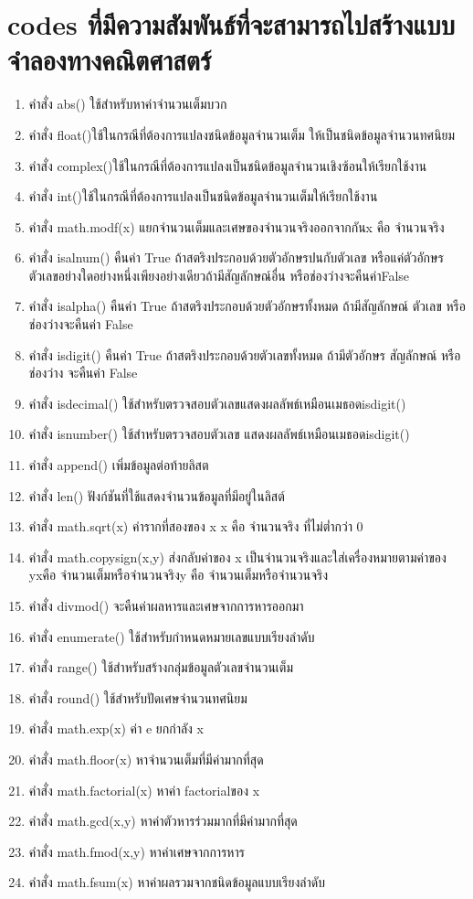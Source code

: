 \documentclass{report}
\begin{document}
\chapter{codes ที่มีความสัมพันธ์ที่จะสามารถไปสร้างแบบจำลองทางคณิตศาสตร์}
\begin{enumerate}
	\item{คำสั่ง abs() ใช้สำหรับหาค่าจำนวนเต็มบวก}
	\item{คำสั่ง float()ใช้ในกรณีที่ต้องการแปลงชนิดข้อมูลจำนวนเต็ม ให้เป็นชนิดข้อมูลจำนวนทศนิยม}
	\item{คำสั่ง complex()ใช้ในกรณีที่ต้องการแปลงเป็นชนิดข้อมูลจำนวนเชิงซ้อนให้เรียกใช้งาน}
	\item{คำสั่ง int()ใช้ในกรณีที่ต้องการแปลงเป็นชนิดข้อมูลจำนวนเต็มให้เรียกใช้งาน}
	\item{คำสั่ง math.modf(x) แยกจำนวนเต็มและเศษของจำนวนจริงออกจากกันx คือ จำนวนจริง}
	\item{คำสั่ง isalnum() คืนค่า True ถ้าสตริงประกอบด้วยตัวอักษรปนกับตัวเลข หรือแค่ตัวอักษรตัวเลขอย่างใดอย่างหนึ่งเพียงอย่างเดียวถ้ามีสัญลักษณ์อื่น หรือช่องว่างจะคืนค่าFalse}
	\item{คำสั่ง isalpha() คืนค่า True ถ้าสตริงประกอบด้วยตัวอักษรทั้งหมด ถ้ามีสัญลักษณ์ ตัวเลข หรือช่องว่างจะคืนค่า False}
	\item{คำสั่ง isdigit() คืนค่า True ถ้าสตริงประกอบด้วยตัวเลขทั้งหมด ถ้ามีตัวอักษร สัญลักษณ์ หรือช่องว่าง จะคืนค่า False}
	\item{คำสั่ง isdecimal() ใช้สำหรับตรวจสอบตัวเลขแสดงผลลัพธ์เหมือนเมธอดisdigit()}
	\item{คำสั่ง isnumber() ใช้สำหรับตรวจสอบตัวเลข แสดงผลลัพธ์เหมือนเมธอดisdigit()}
	\item{คำสั่ง append() เพิ่มข้อมูลต่อท้ายลิสต}
	\item{คำสั่ง len() ฟังก์ชันที่ใช้แสดงจำนวนข้อมูลที่มีอยู่ในลิสต์}
	\item{คำสั่ง math.sqrt(x) ค่ารากที่สองของ x x คือ จำนวนจริง ที่ไม่ต่ำกว่า 0}
	\item{คำสั่ง math.copysign(x,y) ส่งกลับค่าของ x เป็นจำนวนจริงและใส่เครื่องหมายตามค่าของ yxคือ จำนวนเต็มหรือจำนวนจริงy คือ จำนวนเต็มหรือจำนวนจริง}
	\item{คำสั่ง divmod() จะคืนค่าผลหารและเศษจากการหารออกมา}
	\item{คำสั่ง enumerate() ใช้สำหรับกำหนดหมายเลขแบบเรียงลำดับ}
	\item{คำสั่ง range() ใช้สำหรับสร้างกลุ่มข้อมูลตัวเลขจำนวนเต็ม}
	\item{คำสั่ง round() ใช้สำหรับปัดเศษจำนวนทศนิยม}
	\item{คำสั่ง math.exp(x) ค่า e ยกกำลัง x}
	\item{คำสั่ง math.floor(x) หาจำนวนเต็มที่มีค่ามากที่สุด}
	\item{คำสั่ง math.factorial(x) หาค่า factorialของ x}
	\item{คำสั่ง math.gcd(x,y) หาค่าตัวหารร่วมมากที่มีค่ามากที่สุด}
	\item{คำสั่ง math.fmod(x,y) หาค่าเศษจากการหาร}
	\item{คำสั่ง math.fsum(x) หาค่าผลรวมจากชนิดข้อมูลแบบเรียงลำดับ}
\end{enumerate}
\printbibliography
\end{document}
